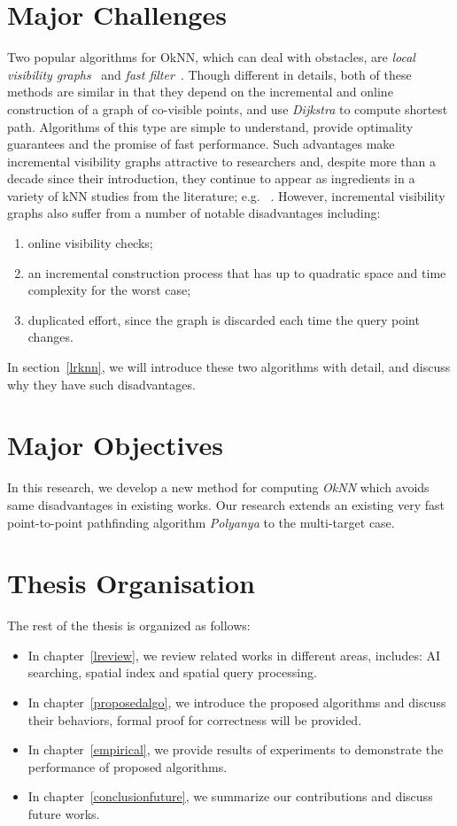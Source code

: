 \section{Major Challenges}
Two popular algorithms for OkNN, which can deal with obstacles, are
\emph{local visibility graphs}~\cite{zhang2004spatial} and \emph{fast
filter}~\cite{xia2004fast}. Though different in details, both of these methods
are similar in that they depend on the incremental and online construction of 
a graph of co-visible points, and use \textit{Dijkstra} to compute shortest path.
Algorithms of this type are simple to understand, 
provide optimality guarantees and the promise of fast performance. 
Such advantages make incremental visibility graphs attractive to researchers 
and, despite more than a decade since their introduction, they continue to 
appear as ingredients in a variety of kNN studies from the literature; e.g. 
~\cite{gao2011efficient,gao2016reverse,gao2009continuous}.
However, incremental visibility graphs also suffer from a number of notable 
disadvantages including:

\begin{enumerate}
  \item online visibility checks;
  \item an incremental construction process that has up to quadratic space and time complexity for the worst case;
  \item duplicated effort, since the graph is discarded each time the query 
  point changes.
\end{enumerate}

In section~\ref{lrknn}, we will introduce these two algorithms with detail,
and discuss why they have such disadvantages.

\section{Major Objectives}
In this research, we develop a new method for computing \emph{OkNN} which avoids same
disadvantages in existing works. Our research extends an existing very fast point-to-point
pathfinding algorithm \emph{Polyanya} to the multi-target case.

\section{Thesis Organisation}
The rest of the thesis is organized as follows:
\begin{itemize}
  \item In chapter~\ref{lreview}, we review related works in different areas, includes: AI
    searching, spatial index and spatial query processing.
  \item In chapter~\ref{proposedalgo}, we introduce the proposed algorithms and discuss their
    behaviors, formal proof for correctness will be provided.
  \item In chapter~\ref{empirical}, we provide results of experiments to demonstrate the
    performance of proposed algorithms.
  \item In chapter~\ref{conclusionfuture}, we summarize our contributions and discuss future
    works.
\end{itemize}
